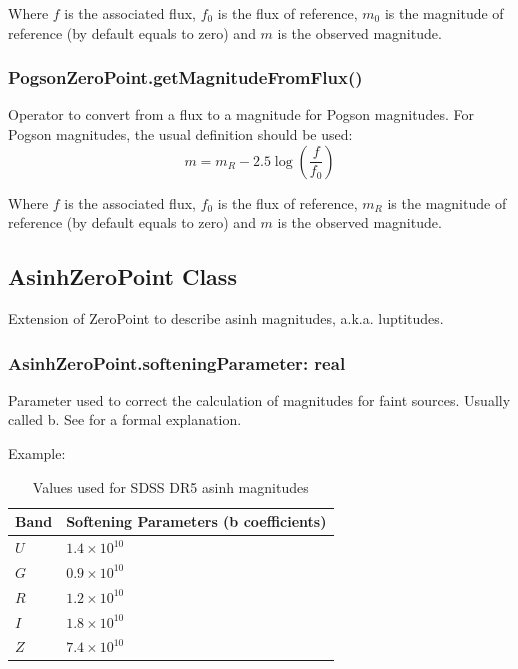 \documentclass[11pt,a4paper]{ivoa}
\begin{document}
Where $f$ is the associated flux, $f_0$ is the flux of reference, $m_0$ is
the magnitude of reference (by default equals to zero) and $m$ is the
observed magnitude.
\par

\subsubsection{PogsonZeroPoint.getMagnitudeFromFlux()}
Operator to convert from a flux to a magnitude for Pogson magnitudes.
For Pogson magnitudes, the usual definition should be used:
\begin{equation} \label{eq:26}
m = m_R - 2.5\log(\frac{f}{f_0 })
\end{equation}

Where $f$ is the associated flux, $f_0$ is the flux of reference,
$m_R$ is the magnitude of reference (by default equals to zero) and
$m$ is the observed magnitude.
\par

\subsection{AsinhZeroPoint Class}
Extension of ZeroPoint  to describe asinh magnitudes, a.k.a. luptitudes.
\par

\subsubsection{AsinhZeroPoint.softeningParameter: real}
Parameter used to correct the calculation of magnitudes for faint
sources. Usually called b. See \citep{1999AJ....118.1406L} for
a formal explanation.
\par

Example:
\par


\begin{table}[ht]
\centering
    \begin{tabular}{|m{2.7cm}|m{8cm}|}
	\hline %
Band & Softening Parameters (b coefficients) \\
\hline
 $U$ & $1.4 \times 10^{10}$ \\
 $G$ & $0.9 \times 10^{10}$ \\
 $R$ & $1.2 \times 10^{10}$ \\
 $I$ & $1.8 \times 10^{10}$ \\
 $Z$ & $7.4 \times 10^{10}$ \\
\hline
\end{tabular}
\caption{Values used for SDSS DR5 asinh magnitudes}

\end{table}
\end{document}
